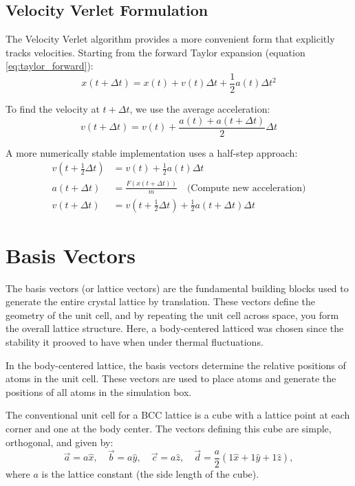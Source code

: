 \subsection{Velocity Verlet Formulation}

The Velocity Verlet algorithm provides a more convenient form that explicitly tracks velocities. Starting from the forward Taylor expansion (equation \ref{eq:taylor_forward}):
\begin{equation}
    x(t+\Delta t) = x(t) + v(t)\Delta t + \frac{1}{2}a(t)\Delta t^2
    \label{eq:vv_position}
\end{equation}

To find the velocity at $t+\Delta t$, we use the average acceleration:
\begin{equation}
    v(t+\Delta t) = v(t) + \frac{a(t) + a(t+\Delta t)}{2}\Delta t
    \label{eq:vv_velocity_simple}
\end{equation}

A more numerically stable implementation uses a half-step approach:
\begin{align}
    v(t+\tfrac{1}{2}\Delta t) &= v(t) + \frac{1}{2}a(t)\Delta t \\
    a(t+\Delta t) &= \frac{F(x(t+\Delta t))}{m} \quad \text{(Compute new acceleration)} \\
    v(t+\Delta t) &= v(t+\tfrac{1}{2}\Delta t) + \frac{1}{2}a(t+\Delta t)\Delta t
    \label{eq:vv_velocity_halfstep}
\end{align}

\section{Basis Vectors}

The basis vectors (or lattice vectors) are the fundamental building blocks used to generate the entire crystal lattice by translation. These vectors define the geometry of the unit cell, and by repeating the unit cell across space, you form the overall lattice structure. Here, a body-centered latticed was chosen since the stability it prooved to have when under thermal fluctuations.

In the body-centered lattice, the basis vectors determine the relative positions of atoms in the unit cell. These vectors are used to place atoms and generate the positions of all atoms in the simulation box.


The conventional unit cell for a BCC lattice is a cube with a lattice point at each corner and one at the body center. The vectors defining this cube are simple, orthogonal, and given by:
%
\begin{equation}
  \vec{a} = a\hat{x}, \quad \vec{b} = a\hat{y}, \quad \vec{c} = a\hat{z}, \quad \vec{d} = \frac{a}{2}\left(  1\hat{x} +  1\hat{y} + 1\hat{z} \right), 
\end{equation}
%
where \( a \) is the lattice constant (the side length of the cube).

